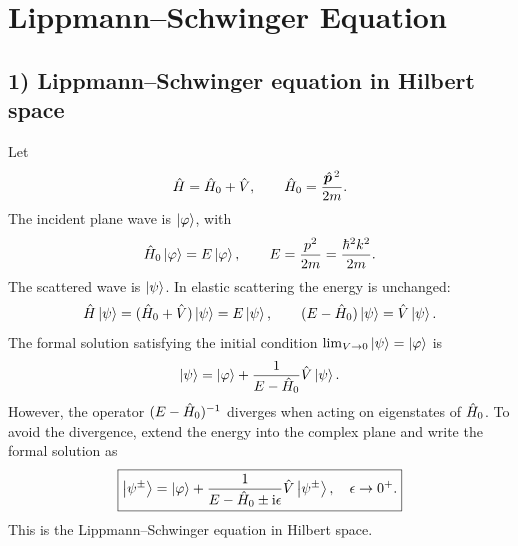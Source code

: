 \section{Lippmann--Schwinger Equation}
\subsection*{1) Lippmann--Schwinger equation in Hilbert space}
Let
\begin{equation}
\hat{H}=\hat{H}_0+\hat{V},\qquad \hat{H}_0=\frac{\hat{\bm{p}}^{\,2}}{2m}.
\end{equation}
The incident plane wave is $\left|\varphi\right\rangle$, with
\begin{equation}
\hat{H}_0\left|\varphi\right\rangle=E\left|\varphi\right\rangle,\qquad E=\frac{p^2}{2m}=\frac{\hbar^2 k^2}{2m}.
\end{equation}
The scattered wave is $\left|\psi\right\rangle$. In elastic scattering the energy is unchanged:
\begin{equation}
\hat{H}\left|\psi\right\rangle=(\hat{H}_0+\hat{V})\left|\psi\right\rangle=E\left|\psi\right\rangle,\qquad
(E-\hat{H}_0)\left|\psi\right\rangle=\hat{V}\left|\psi\right\rangle.
\end{equation}
The formal solution satisfying the initial condition $\lim_{V\to0}\left|\psi\right\rangle=\left|\varphi\right\rangle$ is
\begin{equation}
\left|\psi\right\rangle=\left|\varphi\right\rangle+\frac{1}{E-\hat{H}_0}\hat{V}\left|\psi\right\rangle.
\end{equation}
However, the operator $(E-\hat{H}_0)^{-1}$ diverges when acting on eigenstates of $\hat{H}_0$. To avoid the divergence, extend the energy into the complex plane and write the formal solution as
\begin{equation}
\boxed{\left|\psi^\pm\right\rangle=\left|\varphi\right\rangle+
\frac{1}{E-\hat{H}_0\pm\mathrm{i}\epsilon}\hat{V}\left|\psi^\pm\right\rangle,\quad\epsilon\to0^+.}
\end{equation}
This is the Lippmann--Schwinger equation in Hilbert space.

